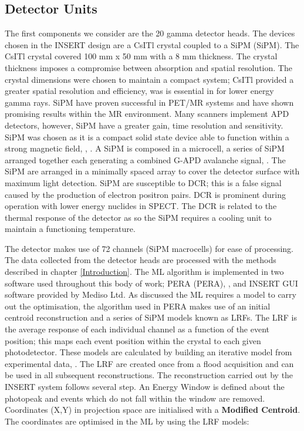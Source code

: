 \subsection{Detector Units}
The first components we consider are the 20 gamma detector heads.  The devices chosen in the INSERT design are a \acrlong{CsITl} crystal coupled to a \acrlong{SiPM} (\acrshort{SiPM}). The \acrshort{CsITl} crystal covered 100 mm x 50 mm with a 8 mm thickness. The crystal thickness imposes a compromise between absorption and spatial resolution. The crystal dimensions were chosen to maintain a compact system; \acrshort{CsITl} provided a greater spatial resolution and efficiency, was is essential in for lower energy gamma rays. \acrshort{SiPM} have proven successful in \acrshort{PET/MR} systems and have shown promising results within the \acrshort{MR} environment. Many scanners implement \acrshort{APD} detectors, however, \acrshort{SiPM} have a greater gain, time resolution and sensitivity.  \acrshort{SiPM} was chosen as it is a compact solid state device able to function within a strong magnetic field, \cite{SCHAART201631}, \cite{0031-9155-56-23-014}. A \acrshort{SiPM} is composed in a microcell, a series of \acrshort{SiPM} arranged together each generating a combined \acrshort{G-APD} avalanche signal, \cite{DINU2015367}. The \acrshort{SiPM} are arranged in a minimally spaced array to cover the detector surface with maximum light detection. \acrshort{SiPM} are susceptible to \acrlong{DCR}; this is a false signal caused by the production of electron positron pairs. \acrshort{DCR} is prominent during operation with lower energy nuclides in \acrshort{SPECT}. The \acrshort{DCR} is related to the thermal response of the detector as so the \acrshort{SiPM} requires a cooling unit to maintain a functioning temperature. 

The detector makes use of 72 channels (\acrshort{SiPM} macrocells) for ease of processing. The data collected from the detector heads are processed with the methods described in chapter \ref{Introduction}. The \acrshort{ML} algorithm is implemented in two software used throughout this body of work; \acrshort{PERA} (\acrlong{PERA}), \cite{OCCHIPINTI2015DevelopmentImaging}, and INSERT GUI software provided by Mediso Ltd. As discussed the \acrshort{ML} requires a model to carry out the optimisation, the algorithm used in \acrshort{PERA} makes use of an initial centroid reconstruction and a series of \acrshort{SiPM} models known as \acrlong{LRF}s. The \acrshort{LRF} is the average response of each individual channel as a function of the event position; this maps each event position within the crystal to each given photodetector. These models are calculated by building an iterative model from experimental data, \cite{Morozov_2017}. The \acrshort{LRF} are created once from a flood acquisition and can be used in all subsequent reconstructions. The reconstruction carried out by the \acrshort{INSERT} system follows several step. An {Energy Window} is defined about the photopeak and events which do not fall within the window are removed. Coordinates (X,Y) in projection space are initialised with a \textbf{Modified Centroid}. The coordinates are optimised in the \acrshort{ML} by using the \acrshort{LRF} models: 

